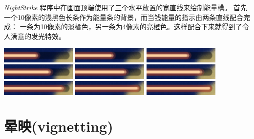 \documentclass[10pt]{book}
\begin{document}
\begin{CJK}{UTF8}{gkai}
\textit{NightStrike} 程序中在画面顶端使用了三个水平放置的宽直线来绘制能量槽。
首先一个10像素的浅黑色长条作为能量条的背景，而当钱能量的指示由两条直线配合完成：
一条为10像素的淡橘色，另一条为4像素的亮橙色。这样配合下来就得到了令人满意的发光特效。

\begin{center}
\includegraphics[width=0.28\textwidth]{assets/ns-pwr-0000.png}
\includegraphics[width=0.28\textwidth]{assets/ns-pwr-0001.png}
\includegraphics[width=0.28\textwidth]{assets/ns-pwr-0002.png}
\includegraphics[width=0.28\textwidth]{assets/ns-pwr-0003.png}
\includegraphics[width=0.28\textwidth]{assets/ns-pwr-0004.png}
\includegraphics[width=0.28\textwidth]{assets/ns-pwr-0005.png}
\includegraphics[width=0.28\textwidth]{assets/ns-pwr-0006.png}
\includegraphics[width=0.28\textwidth]{assets/ns-pwr-0007.png}
\includegraphics[width=0.28\textwidth]{assets/ns-pwr-0008.png}
\end{center}

\newpage
\section{晕映(vignetting)}


\end{CJK}
\end{document}
